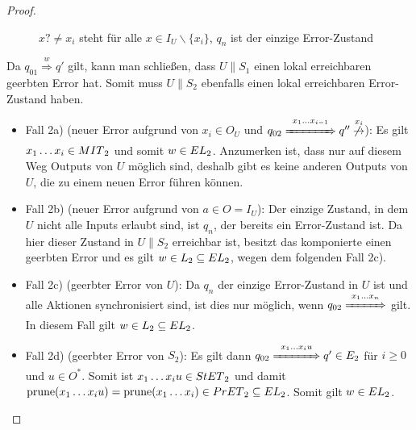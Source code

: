 \begin{proof}
\begin{itemize}
\begin{figure} [h!tbp]
\begin{center}
        \caption{$x?\neq x_i$ steht für alle $x\in I_U\backslash\{x_i\}$, $q_n$
          ist der einzige Error-Zustand}
\label{UmitE}
      \end{center}
      \end{figure}
      Da $q_{01} \overset{w}{\Rightarrow} q'$ gilt, kann man schließen, dass $U\|S_1$
      einen lokal erreichbaren geerbten Error hat. Somit muss $U\|S_2$ ebenfalls einen
      lokal erreichbaren Error-Zustand haben.
      \begin{itemize}
        \item Fall 2a) (neuer Error aufgrund von $x_i\in O_U$ und $q_{02}
          \overset{x_1\dots x_{i-1}}{\xRightarrow{\hspace{1.3cm}}} q''
          \overset{x_i}{\not{\hspace{-0.1cm}\rightarrow}}$): Es gilt $x_1\dots
          x_i\in MIT{}_2$ und somit $w\in EL{}_2$. Anzumerken ist, dass nur
          auf diesem Weg Outputs von $U$ möglich sind, deshalb gibt es keine
          anderen Outputs von $U$, die zu einem neuen Error führen können.
        \item Fall 2b) (neuer Error aufgrund von $a\in O = I_U$): Der einzige
          Zustand, in dem $U$ nicht alle Inputs erlaubt sind, ist $q_n$, der
          bereits ein Error-Zustand ist. Da hier dieser Zustand in $U\|S_2$
          erreichbar ist, besitzt das komponierte \EIO{} einen geerbten Error und
          es gilt $w\in L_2\subseteq EL{}_2$, wegen dem folgenden Fall 2c).
        \item Fall 2c) (geerbter Error von $U$): Da $q_n$ der einzige
          Error-Zustand in $U$ ist und alle Aktionen synchronisiert sind, ist dies nur
          möglich, wenn $q_{02} \overset{x_1\dots
          x_n}{\xRightarrow{\hspace{1cm}}}$ gilt. In
          diesem Fall gilt $w\in L_2\subseteq EL{}_2$.
        \item Fall 2d) (geerbter Error von $S_2$): Es gilt dann $q_{02}
          \overset{x_1\dots x_iu}{\xRightarrow{\hspace{1.2cm}}} q'\in E_2$ für $i\geq 0$ und
          $u\in O^*$. Somit ist $x_1\dots x_iu\in StET{}_2$ und damit
          $\mathrm{prune}{}(x_1\dots x_iu)=\mathrm{prune}{}(x_1\dots x_i)\in PrET{}_2\subseteq
          EL{}_2$. Somit gilt $w\in EL{}_2$.
      \end{itemize}
  \end{itemize}
\end{proof}

